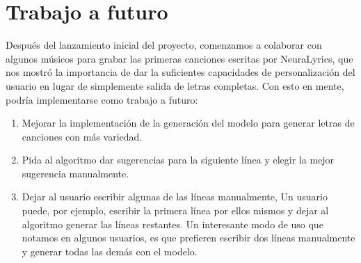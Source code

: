 \documentclass[12pt, a4paper, titlepage]{report}
\begin{document}
\newpage

\chapter{\textcolor{azulescom}{Trabajo a futuro}}

Después del lanzamiento inicial del proyecto, comenzamos a colaborar con algunos músicos para grabar las primeras canciones escritas por NeuraLyrics, que nos mostró la importancia de dar la
suficientes capacidades de personalización del usuario en lugar de simplemente
salida de letras completas. Con esto en mente, podría implementarse como trabajo a futuro:
\begin{enumerate} 
\item Mejorar la implementación de la generación del modelo para generar letras de canciones con más variedad.

\item Pida al algoritmo dar sugerencias para la siguiente línea y elegir la mejor sugerencia manualmente.

\item Dejar al usuario escribir algunas de las líneas manualmente, Un usuario puede, por ejemplo, escribir la primera línea por ellos mismos y dejar al algoritmo generar las líneas restantes. Un interesante modo de uso que notamos en algunos usuarios, es que prefieren escribir dos líneas manualmente y generar todas las demás con el modelo.


\end{enumerate}
\end{document}
